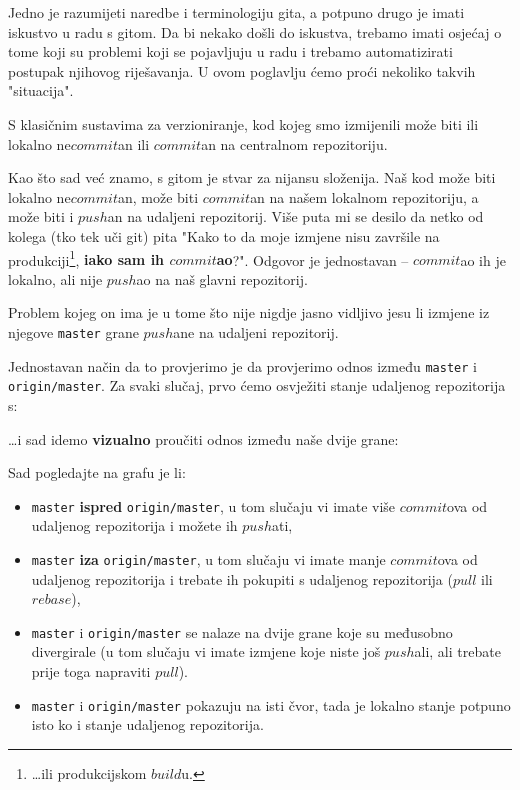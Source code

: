 
Jedno je razumijeti naredbe i terminologiju gita, a potpuno drugo je imati iskustvo u radu s gitom.
Da bi nekako došli do iskustva, trebamo imati osjećaj o tome koji su problemi koji se pojavljuju u radu i trebamo automatizirati postupak njihovog riješavanja.
U ovom poglavlju ćemo proći nekoliko takvih "situacija".


S klasičnim sustavima za verzioniranje, kod kojeg smo izmijenili može biti ili lokalno ne$commit$an ili $commit$an na centralnom repozitoriju.

Kao što sad već znamo, s gitom je stvar za nijansu složenija.
Naš kod može biti lokalno ne$commit$an, može biti $commit$an na našem lokalnom repozitoriju, a može biti i $push$an na udaljeni repozitorij.
Više puta mi se desilo da netko od kolega (tko tek uči git) pita "Kako to da moje izmjene nisu završile na produkciji\footnote{\dots{}ili produkcijskom $build$u.}, \textbf{iako sam ih $commit$ao}?".
Odgovor je jednostavan -- $commit$ao ih je lokalno, ali nije $push$ao na naš glavni repozitorij.

Problem kojeg on ima je u tome što nije nigdje jasno vidljivo jesu li izmjene iz njegove \verb+master+ grane $push$ane na udaljeni repozitorij.

Jednostavan način da to provjerimo je da provjerimo odnos između \verb+master+ i \verb+origin/master+.
Za svaki slučaj, prvo ćemo osvježiti stanje udaljenog repozitorija s:


\dots{}i sad idemo \textbf{vizualno} proučiti odnos između naše dvije grane:


Sad pogledajte na grafu je li:
\begin{itemize}
    \item \verb+master+ \textbf{ispred} \verb+origin/master+, u tom slučaju vi imate više $commit$ova od udaljenog repozitorija i možete ih $push$ati,
    \item \verb+master+ \textbf{iza} \verb+origin/master+, u tom slučaju vi imate manje $commit$ova od udaljenog repozitorija i trebate ih pokupiti s udaljenog repozitorija ($pull$ ili $rebase$),
    \item \verb+master+ i \verb+origin/master+ se nalaze na dvije grane koje su međusobno divergirale (u tom slučaju vi imate izmjene koje niste još $push$ali, ali trebate prije toga napraviti $pull$).
    \item \verb+master+ i \verb+origin/master+ pokazuju na isti čvor, tada je lokalno stanje potpuno isto ko i stanje udaljenog repozitorija.
\end{itemize}

